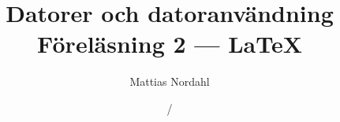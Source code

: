 \documentclass[trans]{beamer}
\author[]{Mattias Nordahl}
\institute{\url{mattias.nordahl@cs.lth.se}}
\date{}
\begin{document}
\title{Datorer och datoranvändning\\Föreläsning 2 --- \LaTeX}

\frame[plain]{
	\maketitle
	\vspace{-2\baselineskip}
}

\date{\the\year/\the\numexpr{}}


\end{document}
